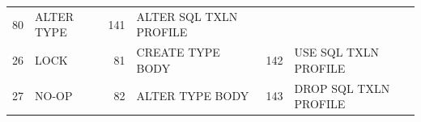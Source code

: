 \begin{appendix}
\begin{longtable}[]{@{}rl|rl|rl@{}}
\begin{minipage}[t]{0.06\columnwidth}
80\strut
\end{minipage} & \begin{minipage}[t]{0.24\columnwidth}\raggedright\strut
ALTER TYPE\strut
\end{minipage} & \begin{minipage}[t]{0.06\columnwidth}\raggedright\strut
141\strut
\end{minipage} & \begin{minipage}[t]{0.24\columnwidth}\raggedright\strut
ALTER SQL TXLN PROFILE\strut
\end{minipage}\tabularnewline
\begin{minipage}[t]{0.06\columnwidth}\raggedright\strut
26\strut
\end{minipage} & \begin{minipage}[t]{0.19\columnwidth}\raggedright\strut
LOCK\strut
\end{minipage} & \begin{minipage}[t]{0.06\columnwidth}\raggedright\strut
81\strut
\end{minipage} & \begin{minipage}[t]{0.24\columnwidth}\raggedright\strut
CREATE TYPE BODY\strut
\end{minipage} & \begin{minipage}[t]{0.06\columnwidth}\raggedright\strut
142\strut
\end{minipage} & \begin{minipage}[t]{0.24\columnwidth}\raggedright\strut
USE SQL TXLN PROFILE\strut
\end{minipage}\tabularnewline
\begin{minipage}[t]{0.06\columnwidth}\raggedright\strut
27\strut
\end{minipage} & \begin{minipage}[t]{0.19\columnwidth}\raggedright\strut
NO-OP\strut
\end{minipage} & \begin{minipage}[t]{0.06\columnwidth}\raggedright\strut
82\strut
\end{minipage} & \begin{minipage}[t]{0.24\columnwidth}\raggedright\strut
ALTER TYPE BODY\strut
\end{minipage} & \begin{minipage}[t]{0.06\columnwidth}\raggedright\strut
143\strut
\end{minipage} & \begin{minipage}[t]{0.24\columnwidth}\raggedright\strut
DROP SQL TXLN PROFILE\strut
\end{minipage}\tabularnewline

\end{longtable}
\end{appendix}
